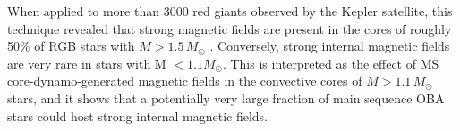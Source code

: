 When applied to more than 3000 red giants observed by the Kepler satellite, this technique revealed that strong magnetic fields are present in the cores of roughly 50\% of RGB stars with $M \! > \! 1.5 \, M_\odot$ \citep{Stello_2016,Stello_2016a}. Conversely, strong internal magnetic fields are very rare in stars with M $< 1.1M_\odot$. This is interpreted as the effect of MS core-dynamo-generated magnetic fields in the convective cores of $M \! > \! 1.1 \, M_\odot$ stars, and it shows that a potentially very large fraction of main sequence OBA stars could host strong internal magnetic fields.



